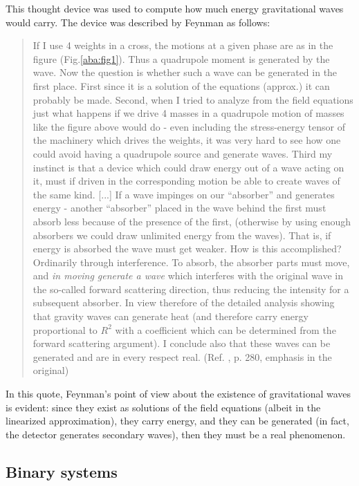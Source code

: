 \documentclass{ws-procs961x669}            %
\begin{document}
This thought device was used to compute how much energy
gravitational waves would carry. The device was described by
Feynman as follows:
%
\begin{quote}
If I use 4 weights in a cross, the motions at a given phase are as
in the figure (Fig.\ref{aba:fig1}). Thus a quadrupole moment is
generated by the wave. Now the question is whether such a wave can
be generated in the first place. First since it is a solution of
the equations (approx.) it can probably be made. Second, when I
tried to analyze from the field equations just what happens if we
drive 4 masses in a quadrupole motion of masses like the figure
above would do - even including the stress-energy tensor of the
machinery which drives the weights, it was very hard to see how
one could avoid having a quadrupole source and generate waves.
Third my instinct is that a device which could draw energy out of
a wave acting on it, must if driven in the corresponding motion be
able to create waves of the same kind. [...] If a wave impinges on
our ``absorber'' and generates energy - another ``absorber''
placed in the wave behind the first must absorb less because of
the presence of the first, (otherwise by using enough absorbers we
could draw unlimited energy from the waves). That is, if energy is
absorbed the wave must get weaker. How is this accomplished?
Ordinarily through interference. To absorb, the absorber parts
must move, and \emph{in moving generate a wave} which interferes
with the original wave in the so-called forward scattering
direction, thus reducing the intensity for a subsequent absorber.
In view therefore of the detailed analysis showing that gravity
waves can generate heat (and therefore carry energy proportional
to $R^2$ with a coefficient which can be determined from the
forward scattering argument). I conclude also that these waves can
be generated and are in every respect real. (Ref.
, p. 280, emphasis in the original)
\end{quote}
%
In this quote, Feynman's point of view about the existence of
gravitational waves is evident: since they exist as solutions of
the field equations (albeit in the linearized approximation), they
carry energy, and they can be generated (in fact, the detector
generates secondary waves), then they must be a real phenomenon.




\subsection{Binary systems}
\end{document}
